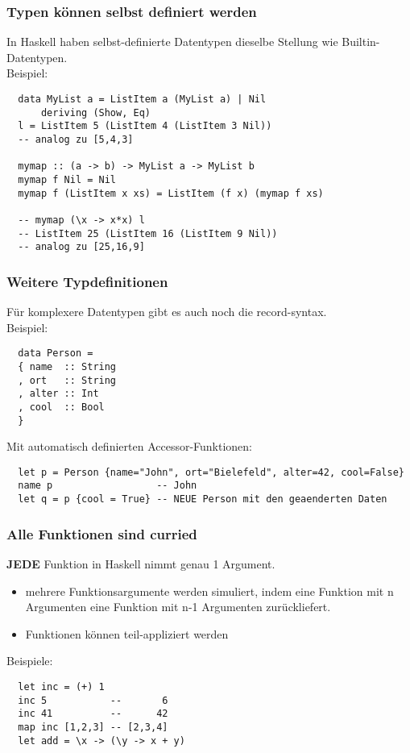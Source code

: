 \documentclass[10pt]{beamer}
\begin{document}
\begin{frame}[fragile]
 \frametitle{Typen können selbst definiert werden}
 In Haskell haben selbst-definierte Datentypen dieselbe Stellung wie Builtin-Datentypen.\\\vspace*{0.5cm}
 \pause
 Beispiel:
 \pause
 \begin{lstlisting}
  data MyList a = ListItem a (MyList a) | Nil
      deriving (Show, Eq)
  l = ListItem 5 (ListItem 4 (ListItem 3 Nil))
  -- analog zu [5,4,3]
 
  mymap :: (a -> b) -> MyList a -> MyList b
  mymap f Nil = Nil
  mymap f (ListItem x xs) = ListItem (f x) (mymap f xs)

  -- mymap (\x -> x*x) l
  -- ListItem 25 (ListItem 16 (ListItem 9 Nil))
  -- analog zu [25,16,9]

 \end{lstlisting}
\end{frame}

\begin{frame}[fragile]
 \frametitle{Weitere Typdefinitionen}
 Für komplexere Datentypen gibt es auch noch die record-syntax.\\\vspace*{0.5cm}
 \pause
 Beispiel:
 \pause
 \begin{lstlisting}
  data Person = 
  { name  :: String
  , ort   :: String
  , alter :: Int
  , cool  :: Bool
  }
 \end{lstlisting}
 \pause
 Mit automatisch definierten Accessor-Funktionen:
 \begin{lstlisting}
  let p = Person {name="John", ort="Bielefeld", alter=42, cool=False}
  name p                  -- John
  let q = p {cool = True} -- NEUE Person mit den geaenderten Daten
 \end{lstlisting}
\end{frame}

\begin{frame}[fragile]
 \frametitle{Alle Funktionen sind curried}
 \textbf{JEDE} Funktion in Haskell nimmt genau 1 Argument.\\\vspace*{0.5cm}
 \pause
 \begin{itemize}
  \item mehrere Funktionsargumente werden simuliert, indem eine Funktion mit n Argumenten eine Funktion mit n-1 Argumenten zurückliefert.
  \pause
  \item Funktionen können teil-appliziert werden
 \end{itemize}
 \pause
 Beispiele:
 \pause
 \begin{lstlisting}
  let inc = (+) 1
  inc 5           --       6
  inc 41          --      42
  map inc [1,2,3] -- [2,3,4]
  let add = \x -> (\y -> x + y)
 \end{lstlisting}
\end{frame}
\end{document}
